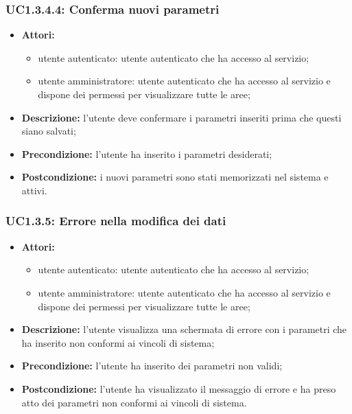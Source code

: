 \subsubsection{UC1.3.4.4: Conferma nuovi parametri}

\begin{itemize}
    \item \textbf{Attori:}
    \begin{itemize}
    	\item utente autenticato: utente autenticato che ha accesso al servizio;
    	\item utente amministratore: utente autenticato che ha accesso al servizio e dispone dei permessi per visualizzare tutte le aree;
	\end{itemize}
    \item \textbf{Descrizione:} l'utente deve confermare i parametri inseriti prima che questi siano salvati;
    \item \textbf{Precondizione:} l'utente ha inserito i parametri desiderati;
    \item \textbf{Postcondizione:} i nuovi parametri sono stati memorizzati nel sistema e attivi.
\end{itemize}

\subsubsection{UC1.3.5: Errore nella modifica dei dati}

\begin{itemize}
    \item \textbf{Attori:}
    \begin{itemize}
    	\item utente autenticato: utente autenticato che ha accesso al servizio;
    	\item utente amministratore: utente autenticato che ha accesso al servizio e dispone dei permessi per visualizzare tutte le aree;
	\end{itemize}
    \item \textbf{Descrizione:} l'utente visualizza una schermata di errore con i parametri che ha inserito non conformi ai vincoli di sistema;
    \item \textbf{Precondizione:} l'utente ha inserito dei parametri non validi;
    \item \textbf{Postcondizione:} l'utente ha visualizzato il messaggio di errore e ha preso atto dei parametri non conformi ai vincoli di sistema.
\end{itemize}

